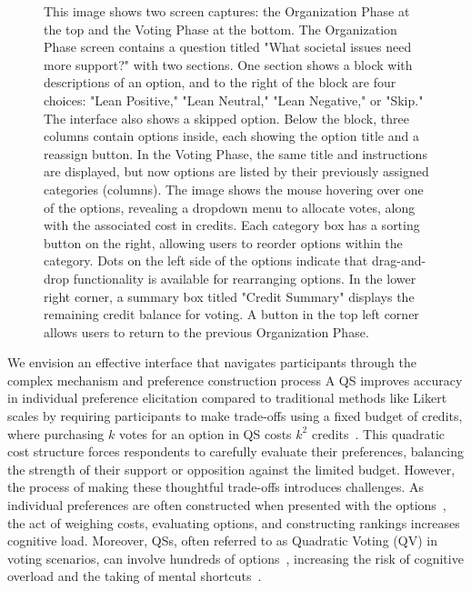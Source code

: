 \begin{figure}[ht]
{    This image shows two screen captures: the Organization Phase at the top and the Voting Phase at the bottom. The Organization Phase screen contains a question titled "What societal issues need more support?" with two sections. One section shows a block with descriptions of an option, and to the right of the block are four choices: "Lean Positive," "Lean Neutral," "Lean Negative," or "Skip." The interface also shows a skipped option. Below the block, three columns contain options inside, each showing the option title and a reassign button. In the Voting Phase, the same title and instructions are displayed, but now options are listed by their previously assigned categories (columns). The image shows the mouse hovering over one of the options, revealing a dropdown menu to allocate votes, along with the associated cost in credits. Each category box has a sorting button on the right, allowing users to reorder options within the category. Dots on the left side of the options indicate that drag-and-drop functionality is available for rearranging options. In the lower right corner, a summary box titled "Credit Summary" displays the remaining credit balance for voting. A button in the top left corner allows users to return to the previous Organization Phase.
    }

\end{figure}

We envision an effective interface that navigates participants through the complex mechanism and preference construction process A QS improves accuracy in individual preference elicitation compared to traditional methods like Likert scales by requiring participants to make trade-offs using a fixed budget of credits, where purchasing $k$ votes for an option in QS costs $k^2$ credits~\cite{quarfoot2017quadratic,chengCanShowWhat2021}. This quadratic cost structure forces respondents to carefully evaluate their preferences, balancing the strength of their support or opposition against the limited budget. However, the process of making these thoughtful trade-offs introduces challenges. As individual preferences are often constructed when presented with the options~\cite{lichtensteinConstructionPreference2006}, the act of weighing costs, evaluating options, and constructing rankings increases cognitive load. Moreover, QSs, often referred to as Quadratic Voting (QV) in voting scenarios, can involve hundreds of options~\cite{rogersColoradoTriedNew2019, teamTaiwanDigitalMinister}, increasing the risk of cognitive overload and the taking of mental shortcuts~\cite{simonBehavioralModelRational1955, payneAdaptiveStrategySelection1988, tverskyJudgmentsRepresentativeness}.

